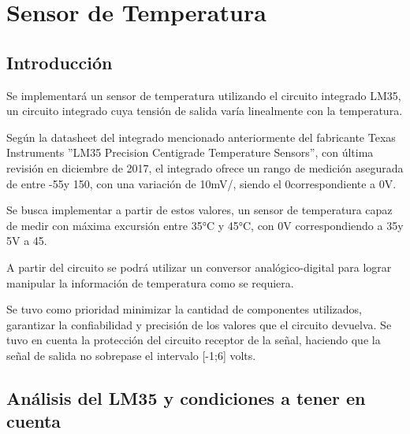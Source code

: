 \documentclass[../../main.tex]{subfiles}
\begin{document}
\section{Sensor de Temperatura}

\subsection{Introducción}

Se implementará un sensor de temperatura utilizando el circuito integrado LM35, un circuito integrado cuya tensión de salida varía linealmente con la temperatura. \par
Según la datasheet del integrado mencionado anteriormente del fabricante Texas Instruments ''LM35 Precision Centigrade Temperature Sensors'', con última revisión en diciembre de 2017, el integrado ofrece un rango de medición asegurada de entre -55\celsius y 150\celsius, con una variación de 10mV/\celsius, siendo el 0\celsius correspondiente a 0V. \par
Se busca implementar a partir de estos valores, un sensor de temperatura capaz de medir con máxima excursión entre 35°C y 45°C, con 0V correspondiendo a 35\celsius y 5V a 45\celsius.\par
A partir del circuito se podrá utilizar un conversor analógico-digital para lograr manipular la información de temperatura como se requiera. \par
Se tuvo como prioridad minimizar la cantidad de componentes utilizados, garantizar la confiabilidad y precisión de los valores que el circuito devuelva. Se tuvo en cuenta la protección del circuito receptor de la señal, haciendo que la señal de salida no sobrepase el intervalo [-1;6] volts.

\subsection{Análisis del LM35 y condiciones a tener en cuenta}
\label{condiciones} 	%
\end{document}

